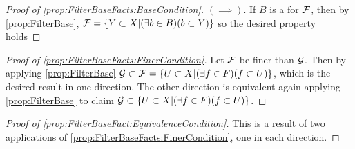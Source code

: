 \begin{prop}[FilterBaseFacts]
\begin{proof}[Proof of \ref{prop:FilterBaseFacts:BaseCondition}]
    $(\implies)$. If $B$ is a \FilterBase for $\mathcal{F}$, then by 
    \ref{prop:FilterBase}, $\mathcal{F}= \{Y \subset X | (\exists b \in B) ( b \subset Y) \}$
    so the desired property holds
   \end{proof}
   \begin{proof}[Proof of \ref{prop:FilterBaseFacts:FinerCondition}]
   Let $\mathcal{F}$ be finer than $\mathcal{G}$. Then 
   by applying \ref{prop:FilterBase}
   $\mathcal{G} \subset \mathcal{F} = \{ U \subset X | (\exists f \in F) (f \subset U) \}$, which is the desired result in one direction. 
   The other direction is equivalent again applying \ref{prop:FilterBase}
   to claim
   $\mathcal{G} \subset \{U \subset X | (\exists f \in F) ( f \subset U ) \}$.
   \end{proof}
   \begin{proof}[Proof of \ref{prop:FilterBaseFact:EquivalenceCondition}]
   This is a result of two applications of \ref{prop:FilterBaseFacts:FinerCondition}, 
   one in each direction. 
   \end{proof}
\end{prop}
